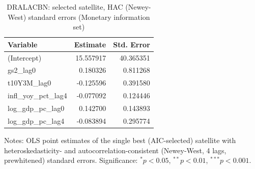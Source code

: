 \begin{table}[!htbp]
\centering
\caption{DRALACBN: selected satellite, HAC (Newey-West) standard errors (Monetary information set)}
\label{tab:dralacbn_monetary_satellite_hac}
\begin{tabular}{lrr}
\toprule
Variable & Estimate & Std. Error \\
\midrule
(Intercept) & 15.557917 & 40.365351 \\
gs2_lag0 & 0.180326 & 0.811268 \\
t10Y3M_lag0 & -0.125596 & 0.391580 \\
infl_yoy_pct_lag4 & -0.077092 & 0.124446 \\
log_gdp_pc_lag0 & 0.142700 & 0.143893 \\
log_gdp_pc_lag4 & -0.083894 & 0.295774 \\
\bottomrule
\end{tabular}
\begin{tablenotes}
\small
\item Notes: OLS point estimates of the single best (AIC-selected) satellite with heteroskedasticity- and autocorrelation-consistent (Newey-West, 4 lags, prewhitened) standard errors. Significance: $^{*}p<0.05$, $^{**}p<0.01$, $^{***}p<0.001$.
\end{tablenotes}
\end{table}
